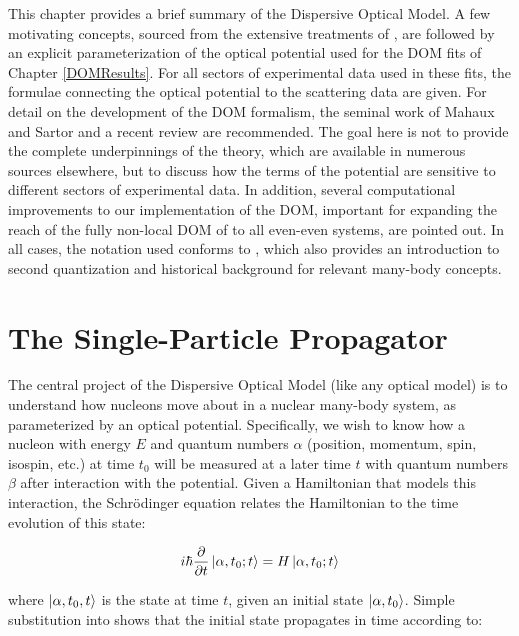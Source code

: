 This chapter provides a brief summary of the Dispersive Optical Model.
A few motivating concepts, sourced from the extensive treatments of \cite{MahzoonPhDThesis, MBTE},
are followed by an explicit parameterization of the optical potential used for the DOM fits of Chapter \ref{DOMResults}.
For all sectors of experimental data used in these fits, the formulae connecting the optical potential
to the scattering data are given. For detail on the development of the DOM formalism, the seminal
work of Mahaux and Sartor \cite{Mahaux1991} and a recent review \cite{Dickhoff2018} are recommended.
The goal here is not to provide the complete underpinnings of the theory, which are available in
numerous sources elsewhere, but to discuss how the terms of the potential are sensitive
to different sectors of experimental data.
In addition, several computational improvements to our implementation of the DOM, important for
expanding the reach of the fully non-local DOM of \cite{MahzoonPhDThesis} to all even-even systems,
are pointed out. In all cases, the notation used conforms to \cite{MBTE}, which also provides an
introduction to second quantization and historical background for relevant many-body concepts.

\section{The Single-Particle Propagator}
The central project of the Dispersive Optical Model (like any optical model) is
to understand how nucleons move about in a nuclear many-body system, as parameterized by an optical
potential.
Specifically, we wish to know
how a nucleon with energy $E$ and quantum numbers $\alpha$
(position, momentum, spin, isospin, etc.) at time $t_{0}$ will be measured at a
later time $t$ with quantum numbers $\beta$ after interaction with the
potential. Given a
Hamiltonian that models this interaction, the Schr\"odinger equation
relates the Hamiltonian to the time evolution of this state:

\begin{equation} \label{SchrodingerEquation}
    i\hbar\frac{\partial}{\partial t}\ket{\alpha, t_{0};t} = H\ket{\alpha,
    t_{0}; t}
\end{equation}

where $\ket{\alpha, t_{0},t}$ is the state at time $t$, given an initial state
$\ket{\alpha, t_{0}}$. Simple substitution into \label{SchrodingerEquation} shows
that the initial state propagates in time according to:

